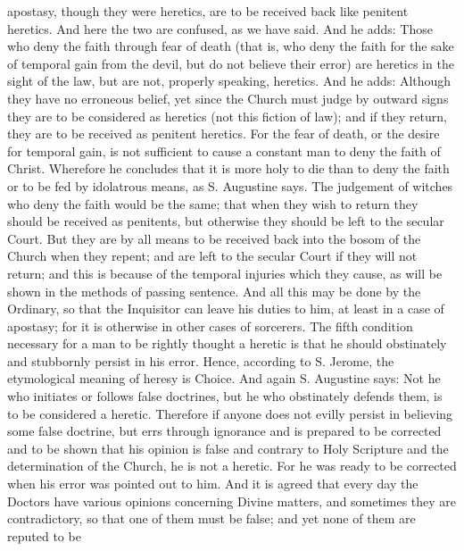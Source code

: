        apostasy, though they were heretics, are to be received back like penitent heretics. And here
       the two are confused, as we have said. And he adds: Those who deny the faith through fear
       of death (that is, who deny the faith for the sake of temporal gain from the devil, but do not
       believe their error) are heretics in the sight of the law, but are not, properly speaking,
       heretics. And he adds: Although they have no erroneous belief, yet since the Church must
       judge by outward signs they are to be considered as heretics (not this fiction of law); and if
       they return, they are to be received as penitent heretics. For the fear of death, or the desire
       for temporal gain, is not sufficient to cause a constant man to deny the faith of Christ.
       Wherefore he concludes that it is more holy to die than to deny the faith or to be fed by
       idolatrous means, as S. Augustine says.
             The judgement of witches who deny the faith would be the same; that when they wish
       to return they should be received as penitents, but otherwise they should be left to the
       secular Court. But they are by all means to be received back into the bosom of the Church
       when they repent; and are left to the secular Court if they will not return; and this is because
       of the temporal injuries which they cause, as will be shown in the methods of passing
       sentence. And all this may be done by the Ordinary, so that the Inquisitor can leave his
       duties to him, at least in a case of apostasy; for it is otherwise in other cases of sorcerers.
             The fifth condition necessary for a man to be rightly thought a heretic is that he should
       obstinately and stubbornly persist in his error. Hence, according to S. Jerome, the
       etymological meaning of heresy is Choice. And again S. Augustine says: Not he who
       initiates or follows false doctrines, but he who obstinately defends them, is to be considered
       a heretic. Therefore if anyone does not evilly persist in believing some false doctrine, but
       errs through ignorance and is prepared to be corrected and to be shown that his opinion is
       false and contrary to Holy Scripture and the determination of the Church, he is not a heretic.
       For he was ready to be corrected when his error was pointed out to him. And it is agreed that
       every day the Doctors have various opinions concerning Divine matters, and sometimes they
       are contradictory, so that one of them must be false; and yet none of them are reputed to be
